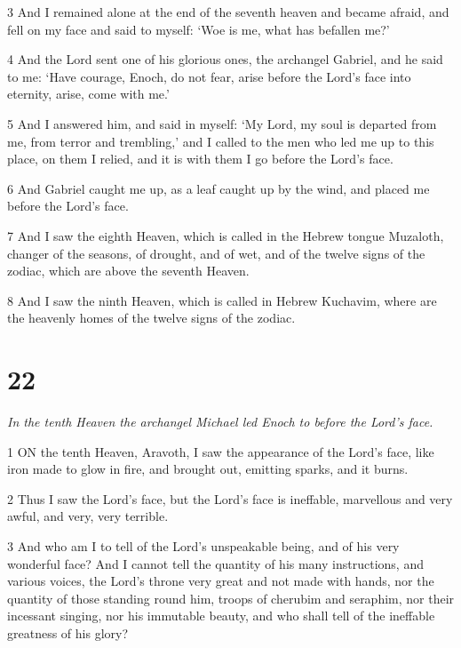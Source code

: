 \par 3 And I remained alone at the end of the seventh heaven and became afraid, and fell on my face and said to myself: ‘Woe is me, what has befallen me?’

\par 4 And the Lord sent one of his glorious ones, the archangel Gabriel, and he said to me: ‘Have courage, Enoch, do not fear, arise before the Lord's face into eternity, arise, come with me.’

\par 5 And I answered him, and said in myself: ‘My Lord, my soul is departed from me, from terror and trembling,’ and I called to the men who led me up to this place, on them I relied, and it is with them I go before the Lord's face.

\par 6 And Gabriel caught me up, as a leaf caught up by the wind, and placed me before the Lord's face.

\par 7 And I saw the eighth Heaven, which is called in the Hebrew tongue Muzaloth, changer of the seasons, of drought, and of wet, and of the twelve signs of the zodiac, which are above the seventh Heaven.

\par 8 And I saw the ninth Heaven, which is called in Hebrew Kuchavim, where are the heavenly homes of the twelve signs of the zodiac.

\chapter{22}

\par \textit{In the tenth Heaven the archangel Michael led Enoch to before the Lord's face.}

\par 1 ON the tenth Heaven, Aravoth, I saw the appearance of the Lord's face, like iron made to glow in fire, and brought out, emitting sparks, and it burns.

\par 2 Thus I saw the Lord's face, but the Lord's face is ineffable, marvellous and very awful, and very, very terrible.

\par 3 And who am I to tell of the Lord's unspeakable being, and of his very wonderful face? And I cannot tell the quantity of his many instructions, and various voices, the Lord's throne very great and not made with hands, nor the quantity of those standing round him, troops of cherubim and seraphim, nor their incessant singing, nor his immutable beauty, and who shall tell of the ineffable greatness of his glory?

